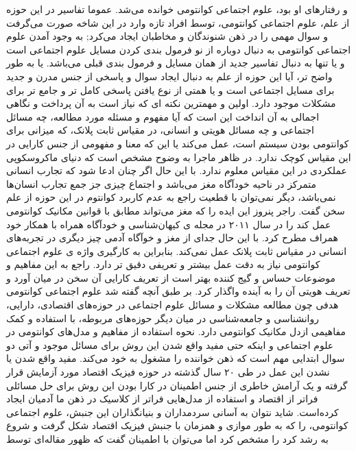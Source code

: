 \documentclass[a4paper,titlepage,12pt,fleqn,oneside]{report}
\begin{document}
و رفتارهای او بود، علوم اجتماعی کوانتومی خوانده می‌شد. عموما تفاسیر در این حوزه از علم، علوم اجتماعی کوانتومی، توسط افراد تازه وارد در این شاخه صورت می‌گرفت و سوال مهمی را در ذهن شنوندگان و مخاطبان ایجاد می‌کرد; به وجود آمدن علوم اجتماعی کوانتومی به دنبال دوباره از نو فرمول بندی کردن مسایل علوم اجتماعی است و یا تنها به دنبال تفاسیر جدید از همان مسایل و فرمول بندی  قبلی می‌باشد. یا به طور واضح تر، آیا این حوزه از علم به دنبال ایجاد سوال و پاسخی از جنس مدرن و جدید برای مسایل اجتماعی است و یا همتی از نوع یافتن پاسخی کامل تر و جامع تر برای مشکلات موجود دارد. اولین و مهمترین نکته ای که نیاز است به آن پرداخت و نگاهی اجمالی به آن انداخت این است که آیا مفهوم و مسئله مورد مطالعه، چه مسائل اجتماعی و چه مسائل هویتی و انسانی، در مقیاس ثابت پلانک، که میزانی برای کوانتومی بودن سیستم است، عمل می‌کند یا این که معنا و مفهومی از جنس کارایی در این مقیاس کوچک ندارد. در ظاهر ماجرا به وضوح مشخص است که دنیای ماکروسکوپی عملکردی در این مقیاس معلوم ندارد. با این حال اگر چنان ادعا شود که تجارب انسانی متمرکز در ناحیه خودآگاه مغز می‌باشد و اجتماع چیزی جز جمع تجارب انسان‌ها نمی‌باشد، دیگر نمی‌توان با قطعیت راجع به عدم کاربرد کوانتوم در این حوزه از علم سخن گفت. راجر پنروز این ایده را که مغز می‌تواند مطابق با قوانین مکانیک کوانتومی عمل کند\cite{penrose} را در سال ۲۰۱۱ در مجله ی کیهان‌شناسی و خودآگاه همراه با همکار خود همراف مطرح کرد\cite{hamrof}. با این حال جدای از مغز و خوآگاه آدمی چیز دیگری در تجربه‌های انسانی در مقیاس ثابت پلانک عمل نمی‌کند. بنابراین به کارگیری واژه ی علوم اجتماعی کوانتومی نیاز به دقت عمل بیشتر و تعریفی دقیق تر دارد.  
راجع به این مفاهیم و موضوعات حساس و گیج کننده بهتر است از
تعریف کارایی آن سخن در میان آورد و تعریف هویتی آن را به آینده واگذار کرد. بر طبق آنچه گفته شد علوم اجتماعی کوانتومی هدفی چون مطالعه مشکلات و مسائل علوم اجتماعی در حوزه‌های اقتصادی، دارایی، روانشناسی و جامعه‌شناسی در میان دیگر حوزه‌های مربوطه، با استفاده و کمک مفاهیمی ازدل مکانیک کوانتومی دارد. نحوه استفاده از مفاهیم و مدل‌های کوانتومی در علوم اجتماعی و اینکه حتی مفید واقع شدن این روش برای مسائل موجود و آتی دو سوال ابتدایی مهم است که ذهن خواننده را مشغول به خود می‌کند. مفید واقع شدن یا نشدن این عمل در طی ۲۰ سال گذشته در حوزه فیزیک اقتصاد مورد آزمایش قرار گرفته و یک آرامش خاطری از جنس اطمینان در کارا بودن این روش برای حل مسائلی فراتر از اقتصاد و استفاده از مدل‌هایی فراتر از کلاسیک در ذهن ما آدمیان ایجاد کرده‌است. شاید نتوان به آسانی سردمداران و بنیانگذاران این جنبش، علوم اجتماعی کوانتومی، را که به طور موازی و همزمان با جنبش فیزیک اقتصاد شکل گرفت و شروع به رشد کرد را مشخص کرد اما می‌توان با اطمینان گفت که ظهور مقاله‌ای\cite{kh2} توسط 
\end{document}
